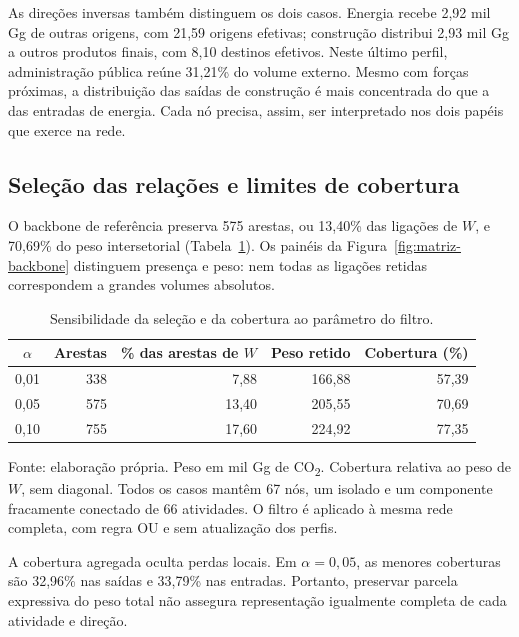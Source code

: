 As direções inversas também distinguem os dois casos. Energia recebe 2,92 mil Gg de outras origens, com 21,59 origens efetivas; construção distribui 2,93 mil Gg a outros produtos finais, com 8,10 destinos efetivos. Neste último perfil, administração pública reúne 31,21\% do volume externo. Mesmo com forças próximas, a distribuição das saídas de construção é mais concentrada do que a das entradas de energia. Cada nó precisa, assim, ser interpretado nos dois papéis que exerce na rede.

\subsection{Seleção das relações e limites de cobertura}

O backbone de referência preserva 575 arestas, ou 13,40\% das ligações de $W$, e 70,69\% do peso intersetorial (Tabela~\ref{tab:sensibilidade-backbone}). Os painéis da Figura~\ref{fig:matriz-backbone} distinguem presença e peso: nem todas as ligações retidas correspondem a grandes volumes absolutos.

\begin{table}[htbp]
\centering
\caption{Sensibilidade da seleção e da cobertura ao parâmetro do filtro.}
\label{tab:sensibilidade-backbone}
\small
\begin{tabular}{@{}crrrr@{}}
\toprule
$\alpha$ & Arestas & \% das arestas de $W$ & Peso retido & Cobertura (\%) \\
\midrule
0,01 & 338 & 7,88 & 166,88 & 57,39 \\
0,05 & 575 & 13,40 & 205,55 & 70,69 \\
0,10 & 755 & 17,60 & 224,92 & 77,35 \\
\bottomrule
\end{tabular}
\par\smallskip\begin{minipage}{\textwidth}\footnotesize
Fonte: elaboração própria. Peso em mil Gg de CO\textsubscript{2}. Cobertura relativa ao peso de $W$, sem diagonal. Todos os casos mantêm 67 nós, um isolado e um componente fracamente conectado de 66 atividades. O filtro é aplicado à mesma rede completa, com regra OU e sem atualização dos perfis.
\end{minipage}
\end{table}

A cobertura agregada oculta perdas locais. Em $\alpha=0{,}05$, as menores coberturas são 32,96\% nas saídas e 33,79\% nas entradas. Portanto, preservar parcela expressiva do peso total não assegura representação igualmente completa de cada atividade e direção.

